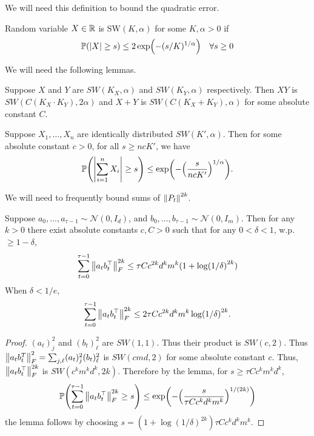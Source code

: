 We will need this definition to bound the quadratic error. 
\begin{definition}
    Random variable $X \in \R$ is $\mathrm{SW}(K,\alpha)$ for some $K,\alpha > 0$ if 
    \begin{align*}
        \P(|X| \geq s) \leq 2\exp(-(s/K)^{1/\alpha}) \quad \forall s \geq 0
    \end{align*}
\end{definition}
We will need the following lemmas.
\begin{lemma}
    Suppose $X$ and $Y$ are $SW(K_X, \alpha)$ and $SW(K_Y, \alpha)$ respectively. Then $XY$ is $SW(C(K_X \cdot K_Y), 2\alpha)$ and $X+Y$ is $SW(C(K_X+K_Y), \alpha)$ for some absolute constant $C$.
\end{lemma}
\begin{lemma}
    Suppose $X_1, \ldots, X_n$ are identically distributed $SW(K', \alpha)$. Then for some absolute constant $c > 0$, for all $s \geq ncK'$, we have
    \begin{align*}
        \P(\qty|\sum_{i=1}^n X_i| \geq s) \leq \exp(-\qty(\frac{s}{ncK'})^{1/\alpha}).
    \end{align*}
\end{lemma}
We will need to frequently bound sums of $\mg{P_t}^{2k}$. 
\begin{lemma}\label{lem:noise-norm}
    Suppose $a_0, \ldots, a_{\tau-1} \sim \mathcal N(0, I_d)$, and $b_0, \ldots, b_{\tau-1} \sim \mathcal N(0, I_m)$. Then for any $k > 0$ there exist absolute constants $c,C > 0$ such that for any $0 < \delta < 1$, w.p. $ \geq 1 -\delta$,
    \begin{align*}
        \sum_{t=0}^{\tau-1} \mg{a_tb_t^\top}^{2k}_F \leq \tau Cc^{2k} d^k m^k (1+\log(1/\delta)^{2k}) 
    \end{align*}
    When $\delta < 1/e$, 
    \begin{align*}
        \sum_{t=0}^{\tau-1} \mg{a_tb_t^\top}^{2k}_F \leq 2\tau Cc^{2k} d^k m^k \log(1/\delta)^{2k}.
    \end{align*}
\end{lemma}

\begin{proof}
    $(a_t)_j^2$ and $(b_t)_\ell^2$ are $SW(1,1)$. Thus their product is $SW(c, 2)$. Thus $\mg{a_tb_t^T}_F^2 = \sum_{j,\ell} (a_t)_j^2 (b_t)_\ell^2$ is $SW(cmd, 2)$ for some absolute constant $c$. Thus, $\mg{a_tb_t^\top}_F^{2k}$ is $SW(c^km^kd^k, 2k)$. Therefore by the lemma, for $s \geq \tau Cc^km^kd^k$,
    \begin{align*}
        \P(\sum_{t=0}^{\tau-1} \mg{a_tb_t^\top}_F^{2k} \geq s) \leq \exp(-\qty(\frac{s}{\tau Cc^kd^km^k})^{1/(2k)})
    \end{align*}
    the lemma follows by choosing $s = (1+\log(1/\delta)^{2k}) \tau Cc^kd^km^k$.
\end{proof}

